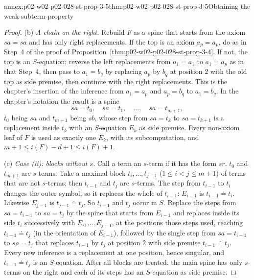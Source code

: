 \begin{annexitem}{annex:p02-w02-p02-028-st-prop-3-5}{thm:p02-w02-p02-028-st-prop-3-5}{Obtaining the weak subterm property}
\begin{proof}
(b) \emph{A chain on the right.}  Rebuild \(F\) as a spine that starts from
the axiom \(sa=sa\) and has only right replacements.  If the top is an axiom
\(a_p=a_p\), do as in Step~4 of the proof of
Proposition~\ref{thm:p02-w02-p02-028-st-prop-3-4}.  If not, the top is an
\(S\)-equation; reverse the left replacements from \(a_1=a_1\) to
\(a_1=a_p\) as in that Step~4, then pass to \(a_1=b_q\) by replacing \(a_p\)
by \(b_q\) at position \(2\) with the old top as side premise, then continue
with the right replacements.  This is the chapter's insertion of the
inference from \(a_1=a_p\) and \(a_p=b_q\) to \(a_1=b_q\).  In the chapter's
notation the result is a spine
\[
 sa=t_0,\quad sa=t_1,\quad\ldots,\quad sa=t_{m+1},
\]
\(t_0\) being \(sa\) and \(t_{m+1}\) being \(sb\), whose step from \(sa=t_k\)
to \(sa=t_{k+1}\) is a replacement inside \(t_k\) with an \(S\)-equation
\(E_k\) as side premise.  Every non-axiom leaf of \(F\) is used as exactly
one \(E_k\), with its subcomputation, and \(m+1\leq i(F)-d+1\leq i(F)+1\).

(c) \emph{Case (ii): blocks without \(s\).}  Call a term an \(s\)-term if it
has the form \(sr\).  \(t_0\) and \(t_{m+1}\) are \(s\)-terms.  Take a maximal
block \(t_i,\ldots,t_{j-1}\) (\(1\leq i<j\leq m+1\)) of terms that are not
\(s\)-terms; then \(t_{i-1}\) and \(t_j\) are \(s\)-terms.  The step from
\(t_{i-1}\) to \(t_i\) changes the outer symbol, so it replaces the whole of
\(t_{i-1}\): \(E_{i-1}\) is \(t_{i-1}\doteq t_i\).  Likewise \(E_{j-1}\) is
\(t_{j-1}\doteq t_j\).  So \(t_{i-1}\) and \(t_j\) occur in \(S\).  Replace
the steps from \(sa=t_{i-1}\) to \(sa=t_j\) by the spine that starts from
\(E_{i-1}\) and replaces inside its side \(t_i\) successively with
\(E_i,\ldots,E_{j-1}\), at the positions those steps used, reaching
\(t_{i-1}\doteq t_j\) (in the orientation of \(E_{i-1}\)), followed by the
single step from \(sa=t_{i-1}\) to \(sa=t_j\) that replaces \(t_{i-1}\) by
\(t_j\) at position \(2\) with side premise \(t_{i-1}\doteq t_j\).  Every new
inference is a replacement at one position, hence singular, and
\(t_{i-1}\doteq t_j\) is an \(S\)-equation.  After all blocks are treated, the
main spine has only \(s\)-terms on the right and each of its steps has an
\(S\)-equation as side premise.


\end{proof}
\end{annexitem}
